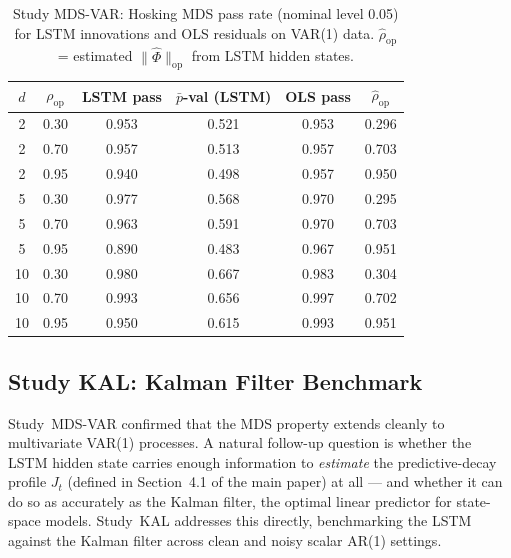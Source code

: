 \documentclass[bj,authoryear]{imsart}
\theoremstyle{plain}
\theoremstyle{definition}
\begin{document}
\begin{table}[t]
\centering
\caption{Study MDS-VAR: Hosking MDS pass rate (nominal level 0.05) for LSTM
  innovations and OLS residuals on VAR(1) data.
  $\hat{\rho}_{\mathrm{op}}$ = estimated $\|\hat\Phi\|_{\mathrm{op}}$ from LSTM hidden states.}
\label{tab:mds-var}
\small
\begin{tabular}{cccccc}
\toprule
$d$ & $\rho_{\mathrm{op}}$ & LSTM pass & $\bar{p}$-val (LSTM) & OLS pass & $\hat\rho_{\mathrm{op}}$ \\
\midrule
2 & 0.30 & 0.953 & 0.521 & 0.953 & 0.296 \\
2 & 0.70 & 0.957 & 0.513 & 0.957 & 0.703 \\
2 & 0.95 & 0.940 & 0.498 & 0.957 & 0.950 \\
\midrule
5 & 0.30 & 0.977 & 0.568 & 0.970 & 0.295 \\
5 & 0.70 & 0.963 & 0.591 & 0.970 & 0.703 \\
5 & 0.95 & 0.890 & 0.483 & 0.967 & 0.951 \\
\midrule
10 & 0.30 & 0.980 & 0.667 & 0.983 & 0.304 \\
10 & 0.70 & 0.993 & 0.656 & 0.997 & 0.702 \\
10 & 0.95 & 0.950 & 0.615 & 0.993 & 0.951 \\
\bottomrule
\end{tabular}
\end{table}


\subsection{Study KAL: Kalman Filter Benchmark}
\label{app:supp-kal}

Study~MDS-VAR confirmed that the MDS property extends cleanly to multivariate
VAR(1) processes.
A natural follow-up question is whether the LSTM hidden state carries
enough information to \emph{estimate} the predictive-decay profile $J_t$ (defined in
Section~4.1 of the main paper) at all --- and whether it can do so as accurately as the Kalman filter,
the optimal linear predictor for state-space models.
Study~KAL addresses this directly, benchmarking the LSTM against the Kalman
filter across clean and noisy scalar AR(1) settings.
\end{document}
